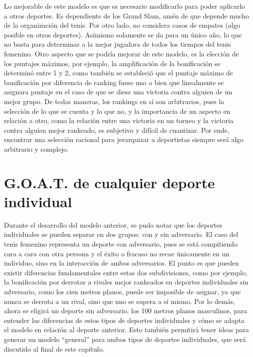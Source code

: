 \documentclass[a4paper]{article}
\begin{document}
Lo mejorable de este modelo es que es necesario modificarlo para poder aplicarlo a otros deportes. Es dependiente de los Grand Slam, amén de que depende mucho de la organización del tenis. Por otro lado, no considera casos de empates (algo posible en otros deportes). Asimismo solamente se da para un único año, lo que no basta para determinar a la mejor jugadora de todos los tiempos del tenis femenino. \newline\newline
Otro aspecto que se podría mejorar de este modelo, es la elección de los puntajes máximos, por ejemplo, la amplificación de la bonificación se determinó entre 1 y 2, como también se estableció que el puntaje máximo de bonificación por diferencia de ranking fuese uno o bien que linealmente se asignara puntaje en el caso de que se diese una victoria contra alguien de un mejor grupo. \newline\newline
De todas maneras, los rankings en sí son arbitrarios, pues la selección de lo que se cuenta y lo que no, y la importancia de un aspecto en relación a otro, como la relación entre una victoria en un torneo y la victoria contra alguien mejor rankeado, es subjetivo y difícil de cuantizar. Por ende, encontrar una selección racional para jerarquizar a deportistas siempre será algo arbitrario y complejo. \newline


\section{G.O.A.T. de cualquier deporte individual}
Durante el desarrollo del modelo anterior, se pudo notar que los deportes individuales se pueden separar en dos grupos: con y sin adversario. El caso del tenis femenino representa un deporte con adversario, pues se está compitiendo cara a cara con otra persona y el éxito o fracaso no recae únicamente en un individuo, sino en la interacción de ambos adversarios. \newline\newline
El punto es que pueden existir diferencias fundamentales entre estas dos subdivisiones, como por ejemplo, la bonificación por derrotar a rivales mejor rankeados en deportes individuales sin adversario, como los cien metros planos, puede ser imposible de asignar, ya que nunca se derrota a un rival, sino que uno se supera a sí mismo. \newline\newline Por lo demás, ahora se eligirá un deporte sin adversario, los 100 metros planos masculinos, para entender las diferencias de estos tipos de deportes individuales y cómo se adapta el modelo en relación al deporte anterior. Esto también permitirá tener ideas para generar un modelo “general” para ambos tipos de deportes individuales, que será discutido al final de este capítulo. 
\end{document}
